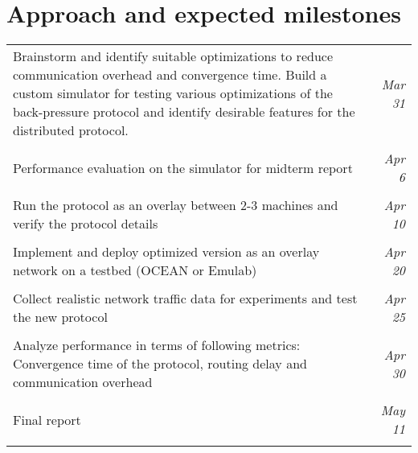 \label{sec:timeline}
\section*{Approach and expected milestones}
\begin{tabular}{L{13.5cm} r}
Brainstorm and identify suitable optimizations to reduce communication overhead and convergence time. Build a custom simulator for testing various optimizations of the back-pressure protocol and identify desirable features for the distributed protocol. & \textit{Mar 31} \\\\
Performance evaluation on the simulator for midterm report & \textit{Apr 6} \\\\
Run the protocol as an overlay between 2-3 machines and verify the protocol details & \textit{Apr 10}\\\\
Implement and deploy optimized version as an overlay network on a testbed (OCEAN or Emulab)  & \textit{Apr 20} \\\\
Collect realistic network traffic data for experiments and test the new protocol & \textit{Apr 25} \\\\
Analyze performance in terms of following metrics: Convergence time of the protocol, routing delay and communication overhead & \textit{Apr 30} \\\\
Final report & \textit{May 11} \\\\
\end{tabular}